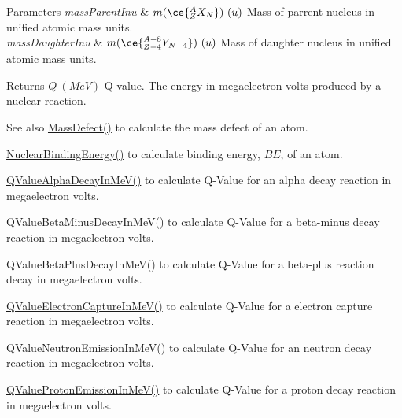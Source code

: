 \begin{DoxyParams}{Parameters}
{\em mass\+Parent\+Inu} & $m(\ce{ ^{A}_{Z}X_{N} })\ (u)$ Mass of parrent nucleus in unified atomic mass units. \\
\hline
{\em mass\+Daughter\+Inu} & $m(\ce{ ^{A-8}_{Z-4}Y_{N-4} })\ (u)$ Mass of daughter nucleus in unified atomic mass units. \\
\hline
\end{DoxyParams}
\begin{DoxyReturn}{Returns}
$Q\ (MeV)$ Q-\/value. The energy in megaelectron volts produced by a nuclear reaction. 
\end{DoxyReturn}
\begin{DoxySeeAlso}{See also}
\mbox{\hyperlink{group___e_g_x_phys-_mass_defect_gae89f2dfa65992c0314adc2440b2f582a}{Mass\+Defect()}} to calculate the mass defect of an atom. 

\mbox{\hyperlink{group___e_g_x_phys-_nuclear_binding_energy_gab6832bf15ead7b4e867e759e0a2a078e}{Nuclear\+Binding\+Energy()}} to calculate binding energy, $BE$, of an atom. 

\mbox{\hyperlink{group___e_g_x_phys-_q_value-_alpha_ga4f9a38d3ad4bf93471a0affb493b6e72}{Q\+Value\+Alpha\+Decay\+In\+Me\+V()}} to calculate Q-\/\+Value for an alpha decay reaction in megaelectron volts. 

\mbox{\hyperlink{group___e_g_x_phys-_q_value-_beta_minus_gaac1374ce9ba39bef416f34298708bda9}{Q\+Value\+Beta\+Minus\+Decay\+In\+Me\+V()}} to calculate Q-\/\+Value for a beta-\/minus decay reaction in megaelectron volts. 

Q\+Value\+Beta\+Plus\+Decay\+In\+Me\+V() to calculate Q-\/\+Value for a beta-\/plus reaction decay in megaelectron volts. 

\mbox{\hyperlink{group___e_g_x_phys-_q_value-_electron_capture_ga9cd8502b6101614c17114e9710cdcf6c}{Q\+Value\+Electron\+Capture\+In\+Me\+V()}} to calculate Q-\/\+Value for a electron capture reaction in megaelectron volts. 

Q\+Value\+Neutron\+Emission\+In\+Me\+V() to calculate Q-\/\+Value for an neutron decay reaction in megaelectron volts. 

\mbox{\hyperlink{group___e_g_x_phys-_q_value-_proton_ga5d92756e945e66bd2ed7d55145b95c3b}{Q\+Value\+Proton\+Emission\+In\+Me\+V()}} to calculate Q-\/\+Value for a proton decay reaction in megaelectron volts. 
\end{DoxySeeAlso}
